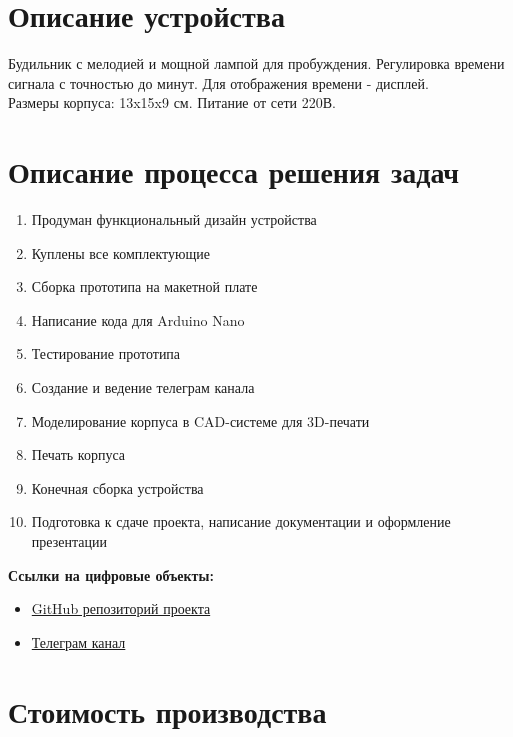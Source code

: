 \documentclass[12pt,a4paper]{article}
\begin{document}
\section{Описание устройства}

Будильник с мелодией и мощной лампой для пробуждения. Регулировка времени сигнала с точностью до минут. Для отображения времени - дисплей.\\
Размеры корпуса: 13x15x9 см. Питание от сети 220В.

\section{Описание процесса решения задач}

\begin{enumerate}
    \item Продуман функциональный дизайн устройства
    \item Куплены все комплектующие
    \item Сборка прототипа на макетной плате
    \item Написание кода для Arduino Nano
    \item Тестирование прототипа
    \item Создание и ведение телеграм канала
    \item Моделирование корпуса в CAD-системе для 3D-печати
    \item Печать корпуса
    \item Конечная сборка устройства
    \item Подготовка к сдаче проекта, написание документации и оформление презентации
\end{enumerate}

\textbf{Ссылки на цифровые объекты:}
\begin{itemize}
    \item \href{https://github.com/nniikon/ArduinoAlarm}{GitHub репозиторий проекта}
    \item \href{https://t.me/budilnikmipt}{Телеграм канал}
\end{itemize}

\section{Стоимость производства}
\end{document}
